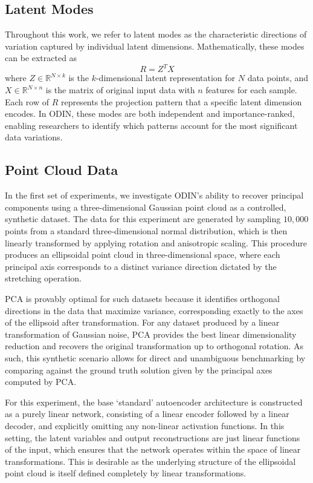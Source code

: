 \documentclass[twoside,11pt]{article}
\begin{document}
\subsection*{Latent Modes} 
Throughout this work, we refer to latent modes as the characteristic directions of variation captured by individual latent dimensions. Mathematically, these modes can be extracted as 
\begin{equation}
    R = Z^TX
\end{equation}
where $Z\in \mathbb{R}^{N\times k}$ is the $k$-dimensional latent representation for $N$ data points, and $X\in \mathbb{R}^{N\times n}$ is the matrix of original input data with $n$ features for each sample. Each row of $R$ represents the projection pattern that a specific latent dimension encodes. In ODIN, these modes are both independent and importance-ranked, enabling researchers to identify which patterns account for the most significant data variations.

\subsection{Point Cloud Data}

In the first set of experiments, we investigate ODIN’s ability to recover principal components using a three-dimensional Gaussian point cloud as a controlled, synthetic dataset. The data for this experiment are generated by sampling $10,000$ points from a standard three-dimensional normal distribution, which is then linearly transformed by applying rotation and anisotropic scaling. This procedure produces an ellipsoidal point cloud in three-dimensional space, where each principal axis corresponds to a distinct variance direction dictated by the stretching operation.

PCA is provably optimal for such datasets because it identifies orthogonal directions in the data that maximize variance, corresponding exactly to the axes of the ellipsoid after transformation. For any dataset produced by a linear transformation of Gaussian noise, PCA provides the best linear dimensionality reduction and recovers the original transformation up to orthogonal rotation. As such, this synthetic scenario allows for direct and unambiguous benchmarking by comparing against the ground truth solution given by the principal axes computed by PCA.

For this experiment, the base `standard' autoencoder architecture is constructed as a purely linear network, consisting of a linear encoder followed by a linear decoder, and explicitly omitting any non-linear activation functions. In this setting, the latent variables and output reconstructions are just linear functions of the input, which ensures that the network operates within the space of linear transformations. This is desirable as the underlying structure of the ellipsoidal point cloud is itself defined completely by linear transformations.
\end{document}
